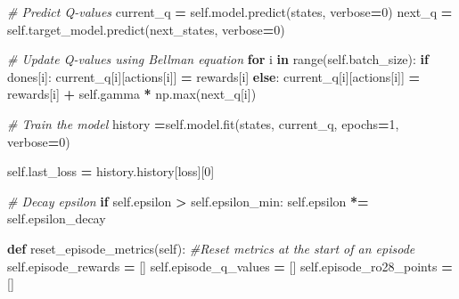 \documentclass[12pt]{article}
\newenvironment{Shaded}{\begin{snugshade}}{\end{snugshade}}
\newcommand{\BuiltInTok}[1]{#1}
\newcommand{\CommentTok}[1]{\textcolor[rgb]{0.56,0.35,0.01}{\textit{#1}}}
\newcommand{\ControlFlowTok}[1]{\textcolor[rgb]{0.13,0.29,0.53}{\textbf{#1}}}
\newcommand{\DecValTok}[1]{\textcolor[rgb]{0.00,0.00,0.81}{#1}}
\newcommand{\KeywordTok}[1]{\textcolor[rgb]{0.13,0.29,0.53}{\textbf{#1}}}
\newcommand{\NormalTok}[1]{#1}
\newcommand{\OperatorTok}[1]{\textcolor[rgb]{0.81,0.36,0.00}{\textbf{#1}}}
\newcommand{\StringTok}[1]{\textcolor[rgb]{0.31,0.60,0.02}{#1}}
\newcommand{\VariableTok}[1]{\textcolor[rgb]{0.00,0.00,0.00}{#1}}
\begin{document}
\begin{thesis}
\begin{Shaded}
\begin{Highlighting}[]
        \CommentTok{\# Predict Q{-}values}
\NormalTok{        current\_q }\OperatorTok{=} \VariableTok{self}\NormalTok{.model.predict(states, verbose}\OperatorTok{=}\DecValTok{0}\NormalTok{)}
\NormalTok{        next\_q }\OperatorTok{=} \VariableTok{self}\NormalTok{.target\_model.predict(next\_states, verbose}\OperatorTok{=}\DecValTok{0}\NormalTok{)}
        
        \CommentTok{\# Update Q{-}values using Bellman equation}
        \ControlFlowTok{for}\NormalTok{ i }\KeywordTok{in} \BuiltInTok{range}\NormalTok{(}\VariableTok{self}\NormalTok{.batch\_size):}
            \ControlFlowTok{if}\NormalTok{ dones[i]:}
\NormalTok{                current\_q[i][actions[i]] }\OperatorTok{=}\NormalTok{ rewards[i]}
            \ControlFlowTok{else}\NormalTok{:}
\NormalTok{                current\_q[i][actions[i]] }\OperatorTok{=}\NormalTok{ rewards[i] }\OperatorTok{+} 
                                           \VariableTok{self}\NormalTok{.gamma }\OperatorTok{*}\NormalTok{ np.}\BuiltInTok{max}\NormalTok{(next\_q[i])}
        
        \CommentTok{\# Train the model}
\NormalTok{        history }\OperatorTok{=}\VariableTok{self}\NormalTok{.model.fit(states, current\_q, epochs}\OperatorTok{=}\DecValTok{1}\NormalTok{, verbose}\OperatorTok{=}\DecValTok{0}\NormalTok{)}
        
        \VariableTok{self}\NormalTok{.last\_loss }\OperatorTok{=}\NormalTok{ history.history[}\StringTok{\textquotesingle{}loss\textquotesingle{}}\NormalTok{][}\DecValTok{0}\NormalTok{]}

        \CommentTok{\# Decay epsilon}
        \ControlFlowTok{if} \VariableTok{self}\NormalTok{.epsilon }\OperatorTok{\textgreater{}} \VariableTok{self}\NormalTok{.epsilon\_min:}
            \VariableTok{self}\NormalTok{.epsilon }\OperatorTok{*=} \VariableTok{self}\NormalTok{.epsilon\_decay}
    
    \KeywordTok{def}\NormalTok{ reset\_episode\_metrics(}\VariableTok{self}\NormalTok{):}
        \CommentTok{\#Reset metrics at the start of an episode}
        \VariableTok{self}\NormalTok{.episode\_rewards }\OperatorTok{=}\NormalTok{ []}
        \VariableTok{self}\NormalTok{.episode\_q\_values }\OperatorTok{=}\NormalTok{ []}
        \VariableTok{self}\NormalTok{.episode\_ro28\_points }\OperatorTok{=}\NormalTok{ []}


\end{Highlighting}
\end{Shaded}
\end{thesis}
\end{document}
